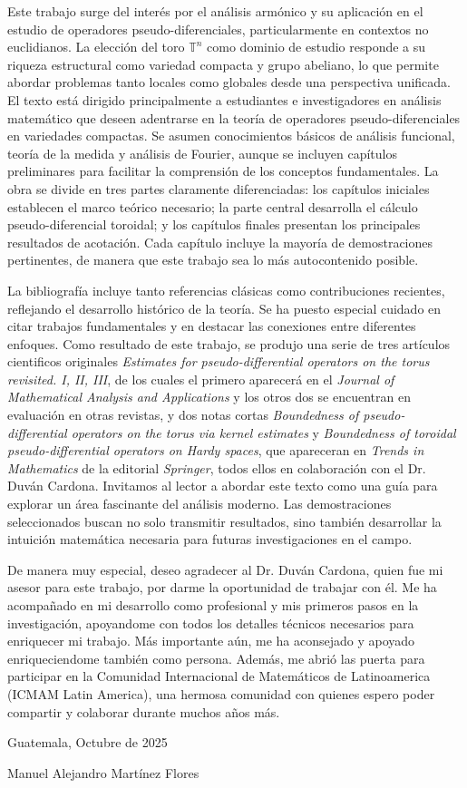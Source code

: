 
Este trabajo surge del interés por el análisis armónico y su aplicación en el estudio de operadores pseudo-diferenciales, particularmente en contextos no euclidianos. La elección del toro $\mathbb{T}^n$ como dominio de estudio responde a su riqueza estructural como variedad compacta y grupo abeliano, lo que permite abordar problemas tanto locales como globales desde una perspectiva unificada. El texto está dirigido principalmente a estudiantes e investigadores en análisis matemático que deseen adentrarse en la teoría de operadores pseudo-diferenciales en variedades compactas. Se asumen conocimientos básicos de análisis funcional, teoría de la medida y análisis de Fourier, aunque se incluyen capítulos preliminares para facilitar la comprensión de los conceptos fundamentales. La obra se divide en tres partes claramente diferenciadas: los capítulos iniciales establecen el marco teórico necesario; la parte central desarrolla el cálculo pseudo-diferencial toroidal; y los capítulos finales presentan los principales resultados de acotación. Cada capítulo incluye la mayoría de demostraciones pertinentes, de manera que este trabajo sea lo más autocontenido posible.


La bibliografía incluye tanto referencias clásicas como contribuciones recientes, reflejando el desarrollo histórico de la teoría. Se ha puesto especial cuidado en citar trabajos fundamentales y en destacar las conexiones entre diferentes enfoques. Como resultado de este trabajo, se produjo una serie de tres artículos cientificos originales \textit{Estimates for pseudo-differential operators on the torus revisited. I, II, III}, de los cuales el primero aparecerá en el \textit{Journal of Mathematical Analysis and Applications} y los otros dos se encuentran en evaluación en otras revistas, y dos notas cortas \textit{Boundedness of pseudo-differential operators on the torus via kernel estimates} y \textit{Boundedness of toroidal pseudo-differential operators on Hardy spaces}, que apareceran en \textit{Trends in Mathematics} de la editorial \textit{Springer}, todos ellos en colaboración con el Dr. Duván Cardona. Invitamos al lector a abordar este texto como una guía para explorar un área fascinante del análisis moderno. Las demostraciones seleccionados buscan no solo transmitir resultados, sino también desarrollar la intuición matemática necesaria para futuras investigaciones en el campo.


De manera muy especial, deseo agradecer al Dr. Duván Cardona, quien fue mi asesor para este trabajo, por darme la oportunidad de trabajar con él. Me ha acompañado en mi desarrollo como profesional y mis primeros pasos en la investigación, apoyandome con todos los detalles técnicos necesarios para enriquecer mi trabajo. Más importante aún, me ha aconsejado y apoyado enriqueciendome también como persona. Además, me abrió las puerta para participar en la Comunidad Internacional de Matemáticos de Latinoamerica (ICMAM Latin America), una hermosa comunidad con quienes espero poder compartir y colaborar durante muchos años más. 

Guatemala, Octubre de 2025

Manuel Alejandro Martínez Flores